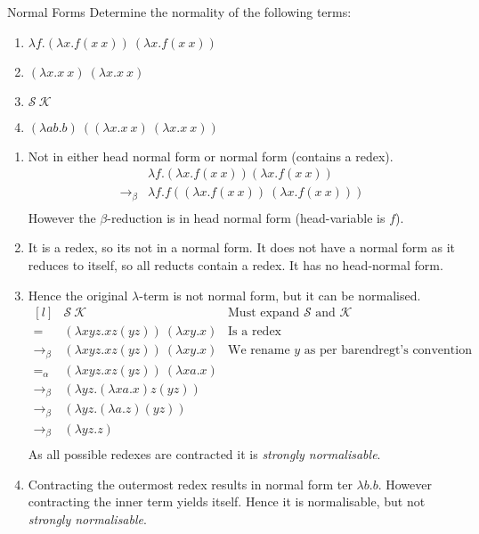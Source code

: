 \begin{examplebox}{Normal Forms}
	Determine the normality of the following terms:
	\begin{enumerate}
		\item $\lambda f . (\lambda x . f(x \ x)) \ (\lambda x . f(x \ x))$
		\item $(\lambda x . x \ x) \ (\lambda x . x \ x)$
		\item $\mathcal{S} \ \mathcal{K}$
		\item $(\lambda a b . b) \ ((\lambda x . x \ x) \ (\lambda x . x \ x))$
	\end{enumerate}
	\tcblower
	\begin{enumerate}
		\item {Not in either head normal form or normal form (contains a redex).
		      \[\begin{split}
				      & \lambda f . (\lambda x . f (x \ x)) (\lambda x . f (x \ x)) \\
				      \to_\beta & \lambda f . f ((\lambda x . f (x \ x)) \ (\lambda x . f (x \ x)))  \\
			      \end{split}\]
		      However the $\beta$-reduction is in head normal form (head-variable is $f$).
		      }
		\item It is a redex, so its not in a normal form. It does not have a normal form as it reduces to itself, so all reducts contain a redex. It has no head-normal form.
		\item { Hence the original $\lambda$-term is not normal form, but it can be normalised.
		      \[\begin{matrix*}[l]
				      & \mathcal{S} \ \mathcal{K} & \text{Must expand }\mathcal{S}\text{ and }\mathcal{K} \\
				      = & (\lambda x y z . x z (y z)) \ (\lambda xy.x) & \text{Is a redex}\\
				      \to_\beta & (\lambda x y z . x z (y z)) \ (\lambda xy.x) & \text{We rename $y$ as per barendregt's convention} \\
				      =_\alpha & (\lambda x y z . x z (y z)) \ (\lambda xa.x) \\
				      \to_\beta & (\lambda y z . (\lambda xa.x) z (y z)) \\
				      \to_\beta & (\lambda y z . (\lambda a. z) (y z)) \\
				      \to_\beta & (\lambda y z . z) \\
			      \end{matrix*}\]
		      As all possible redexes are contracted it is \textit{strongly normalisable}.
		      }
		\item {
		      Contracting the outermost redex results in normal form ter $\lambda b . b$. However contracting the inner term yields itself. Hence it is normalisable, but not \textit{strongly normalisable}.
		      }
	\end{enumerate}
\end{examplebox}

